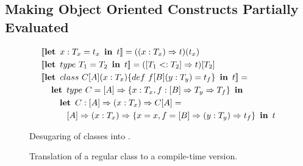 \subsection{Making Object Oriented Constructs Partially Evaluated}
\label{sct:promotion}



\begin{figure}
\begin{alignat*}{2}
   & [\![ \klet\ x: T_x = t_x\ \kin \ t ]\!] = ((x: T_x) \ra t)(t_x)\\
   & [\![ \klet\ type\ T_1 = T_2\ \kin\ t ]\!] =  ([T_1 <: T_2] \ra t)[T_2] \\
   & [\![ \klet\ class\ C[A](x: T_x) \{ def\ f[B](y: T_y) = t_f \}\ \kin\ t ]\!]  =  \\
   & \quad   \klet\ type\  C = [A] \ra \{ x: T_x, f: [B] \ra T_y \ra T_f \}\ \kin  \\
   & \quad \quad \klet\ C: [A] \ra (x: T_x) \ra C[A]  =  \\
   & \quad \quad \quad [A] \ra (x: T_x) \ra \{ x = x, f = [B] \ra (y: T_y) \ra t_f \}\ \kin\ t
\end{alignat*}
\caption{Desugaring of classes into \calculus.}
\label{fig:desugaring-classes}
\end{figure}

\begin{figure}
\begin{multicols}{2}[]

    {\Pi \ts {}}

    {\Pi \ts {}}

\end{multicols}
\vspace{4pt}

    {\Pi \ts {}}

    {\Pi \ts {}}

    {\Pi \ts {}}

    {\Pi \ts {}}

    {\Pi \ts {}}

    {\Pi \ts {}}

    {\Pi \ts {}}

\caption{Translation of a regular class to a compile-time version.}
\label{fig:partial-evaluation}
\end{figure}
